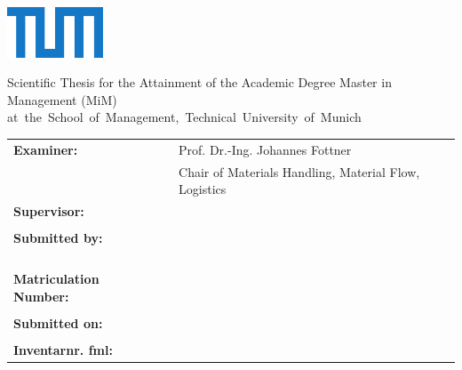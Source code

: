

\makeatletter
\newcommand{\Titelblatt}{%
	\begin{titlepage}
	\raggedbottom
	\begin{flushright}	
	\includegraphics[height=15mm]{./resources/TUM_Logo_blau.pdf} \\ [1ex]
	\end{flushright}

		\begin{LARGE}		
                \raggedright
			\@title \par 
		\end{LARGE}
			
		\begin{Large}
                \raggedright
			\@subtitle \par
		\end{Large}

		\vspace{50 pt}
		
		\begin{large}
			Scientific Thesis for the Attainment of the Academic Degree \newline
			\arbeitstyp Master in Management (MiM) \newline
			\mbox{at the School of Management, Technical University of Munich}
		\end{large}
	
		\vspace{20 pt}

		\begin{table}[h]
			\hskip-0.2cm
			\begin{tabular}{lll}
				\textbf{Examiner:} &  & Prof. Dr.-Ing. Johannes Fottner \\
				&  & Chair of Materials Handling, Material Flow, Logistics \\
				\textbf{Supervisor:}&  & \Betreuer \\
				&  &  \\
				\textbf{Submitted by:} &  & \@author \\
				&  & \adresseI \\
				&  & \adresseII \\
				&  & \telnr \\
				&  & \\
        		\textbf{Matriculation Number:} &  & \matriculation \\
				& & \\
				\textbf{Submitted on:} &  & \abgabetermin{} \\
				& & \\
				\textbf{Inventarnr. fml:}& & \Arbeitsnummer \\
			\end{tabular}
		\end{table}

	 
	\end{titlepage}

}
\makeatother

\Titelblatt

	

